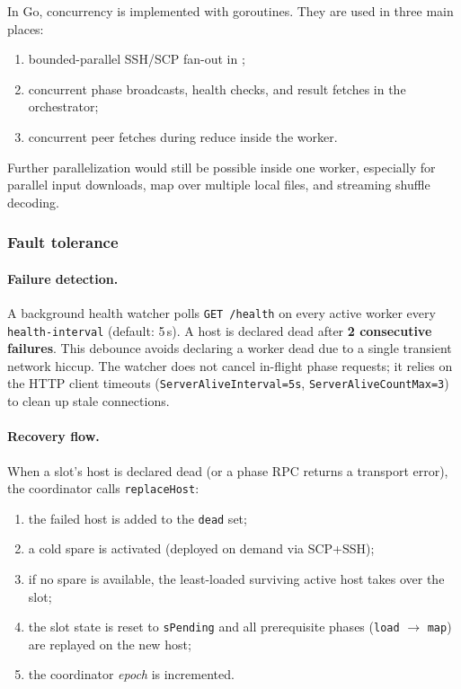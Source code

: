 \documentclass[11pt,a4paper]{article}
\newcommand{\codepath}[1]{\path{#1}}
\begin{document}
In Go, concurrency is implemented with goroutines. They are used in three main
places:
\begin{enumerate}[leftmargin=1.5em]
  \item bounded-parallel SSH/SCP fan-out in
  \codepath{scripts/internal/remote};
  \item concurrent phase broadcasts, health checks, and result fetches in the
  orchestrator;
  \item concurrent peer fetches during reduce inside the worker.
\end{enumerate}

Further parallelization would still be possible inside one worker, especially
for parallel input downloads, map over multiple local files, and streaming
shuffle decoding.

\subsubsection{Fault tolerance}

\paragraph{Failure detection.}
A background health watcher polls \texttt{GET /health} on every active worker
every \texttt{health-interval} (default: 5\,s). A host is declared dead after
\textbf{2 consecutive failures}. This debounce avoids declaring a worker dead
due to a single transient network hiccup. The watcher does not cancel
in-flight phase requests; it relies on the HTTP client timeouts
(\texttt{ServerAliveInterval=5s}, \texttt{ServerAliveCountMax=3}) to clean up
stale connections.

\paragraph{Recovery flow.}
When a slot's host is declared dead (or a phase RPC returns a transport error),
the coordinator calls \texttt{replaceHost}:
\begin{enumerate}[leftmargin=1.5em]
  \item the failed host is added to the \texttt{dead} set;
  \item a cold spare is activated (deployed on demand via SCP+SSH);
  \item if no spare is available, the least-loaded surviving active host takes
  over the slot;
  \item the slot state is reset to \texttt{sPending} and all prerequisite phases
  (\texttt{load} $\to$ \texttt{map}) are replayed on the new host;
  \item the coordinator \emph{epoch} is incremented.
\end{enumerate}
\end{document}
